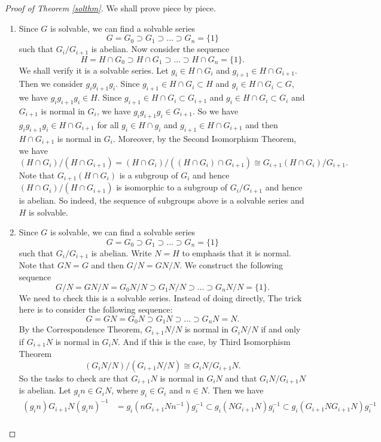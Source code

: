 \documentclass[12pt]{report}
\theoremstyle{definition}
\begin{document}
\begin{proof}[Proof of Theorem \ref{solthm}]
	We shall prove piece by piece.
	\begin{enumerate}
		\item Since $G$ is solvable, we can find a solvable series
		      \[G=G_0 \supset G_1\supset \dots\supset G_n=\{1\}\] such that $G_i/G_{i+1}$ is abelian. Now consider the sequence \[H=H\cap G_0\supset H\cap G_1\supset \dots\supset H\cap G_n=\{1\}.\] We shall verify it is a solvable series. Let $g_i\in H\cap G_i$ and $g_{i+1}\in H\cap G_{i+1}$. Then we consider $g_{i}g_{i+1}g_{i}$. Since $g_{i+1}\in H\cap G_i\subset H$ and $g_i\in H\cap G_i\subset G$, we have $g_{i}g_{i+1}g_{i}\in H$. Since $g_{i+1}\in H\cap G_i\subset G_{i+1}$ and $g_i\in H\cap G_i\subset G_i$ and $G_{i+1}$ is normal in $G_i$, we have $g_{i}g_{i+1}g_{i}\in G_{i+1}$. So we have $g_{i}g_{i+1}g_{i}\in H\cap G_{i+1}$ for all $g_i\in H\cap g_i$ and $g_{i+1}\in H\cap G_{i+1}$ and then $H\cap G_{i+1}$ is normal in $G_{i}$. Moreover, by the Second Isomorphism Theorem, we have $$(H\cap G_{i})/(H\cap G_{i+1}) = (H\cap G_i)/((H\cap G_i)\cap G_{i+1})\cong G_{i+1}(H\cap G_i)/G_{i+1}.$$ Note that $G_{i+1}(H\cap G_i)$ is a subgroup of $G_i$ and hence $(H\cap G_{i})/(H\cap G_{i+1})$ is isomorphic to a subgroup of $G_{i}/G_{i+1}$ and hence is abelian. So indeed, the sequence of subgroups above is a solvable series and $H$ is solvable.
		\item Since $G$ is solvable, we can find a solvable series
		      \[G=G_0 \supset G_1\supset \dots\supset G_n=\{1\}\] such that $G_i/G_{i+1}$ is abelian. Write $N=H$ to emphasis that it is normal. Note that $GN=G$ and then $G/N=GN/N$. We construct the following sequence
		      \[G/N=GN/N=G_0N/N\supset G_1N/N \supset \dots\supset G_nN/N=\{1\}.\]
		      We need to check this is a solvable series. Instead of doing directly, The trick here is to consider the following sequence:
		      $$G=GN=G_0N\supset G_1N \supset \dots\supset G_nN=N.$$
		      By the Correspondence Theorem, $G_{i+1}N/N$ is normal in $G_{i}N/N$ if and only if $G_{i+1}N$ is normal in $G_{i}N$. And if this is the case, by Third Isomorphism Theorem $$(G_{i}N/N)/(G_{i+1}N/N)\cong G_{i}N/G_{i+1}N.$$ So the tasks to check are that $G_{i+1}N$ is normal in $G_{i}N$  and that $G_{i}N/G_{i+1}N$ is abelian. Let $g_in\in G_iN$, where $g_i \in G_i$ and $n\in N$. Then we have
		      \begin{align*}
			      (g_in) G_{i+1}N (g_in)^{-1} & =g_i(nG_{i+1}Nn^{-1})g_i^{-1}\subset g_i(NG_{i+1}N)g_i^{-1} \subset g_i(G_{i+1}NG_{i+1}N)g_i^{-1} \\

\end{align*}
\end{enumerate}
\end{proof}
\end{document}
